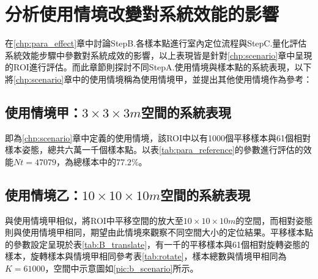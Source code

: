 





\section{分析使用情境改變對系統效能的影響}
\label{chp:scene_effect}
在\ref{chp:para_effect}章中討論StepB.各樣本點進行室內定位流程與StepC.量化評估系統效能步驟中參數對系統成效的影響，以上表現皆是針對\ref{chp:scenario}章中呈現的ROI進行評估。而此章節則探討不同StepA.使用情境與樣本點的系統表現，以下將\ref{chp:scenario}章中的使用情境稱為使用情境甲，並提出其他使用情境作為參考：

\subsection{使用情境甲：$3\times 3\times 3m$空間的系統表現}
\label{chp:scene_A}

即為\ref{chp:scenario}章中定義的使用情境，該ROI中以有1000個平移樣本與61個相對樣本姿態，總共六萬一千個樣本點。以表\ref{tab:para_reference}的參數進行評估的效能$Nt=47079$，為總樣本中的$77.2\%$。

\subsection{使用情境乙：$10\times 10\times 10m$空間的系統表現}
\label{chp:scene_B}

與使用情境甲相似，將ROI中平移空間的放大至$10\times 10\times 10m$的空間，而相對姿態則與使用情境甲相同，期望由此情境來觀察不同空間大小的定位結果。平移樣本點的參數設定呈現於表\ref{tab:B_translate}，有一千的平移樣本與61個相對旋轉姿態的樣本，旋轉樣本與情境甲相同參考表\ref{tab:rotate}，樣本總數與情境甲相同為$K=61000$，空間中示意圖如\ref{pic:b_scenario}所示。

